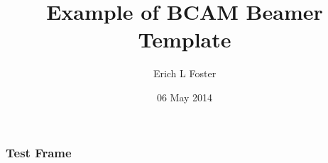 \documentclass{beamer}
\title{Example of BCAM Beamer Template}
\date[]{06 May 2014}
\author[E L Foster]{Erich L Foster}
\begin{document}
\begin{frame}
  \titlepage
\end{frame}

\begin{frame}
  \frametitle{Test Frame}
\end{frame}
\end{document}
